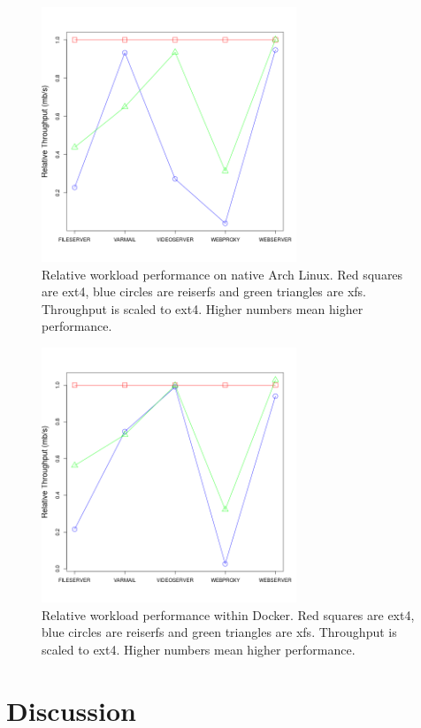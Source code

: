 \documentclass[letterpaper,twocolumn,10pt]{article}
\begin{document}
\begin{figure}[!ht]
\centering
\includegraphics[width=3in]{../results/arch_relative_performance.png}
\caption{Relative workload performance on native Arch Linux. Red squares are ext4, blue circles are reiserfs and green triangles are xfs. Throughput is scaled to ext4. Higher numbers mean higher performance.}
\label{fig:arch_relative_performance}
\end{figure}

\begin{figure}[!ht]
\centering
\includegraphics[width=3in]{../results/dock_relative_performance.png}
\caption{Relative workload performance within Docker. Red squares are ext4, blue circles are reiserfs and green triangles are xfs. Throughput is scaled to ext4. Higher numbers mean higher performance.}
\label{fig:dock_relative_performance}
\end{figure}



\section{Discussion}
\end{document}
